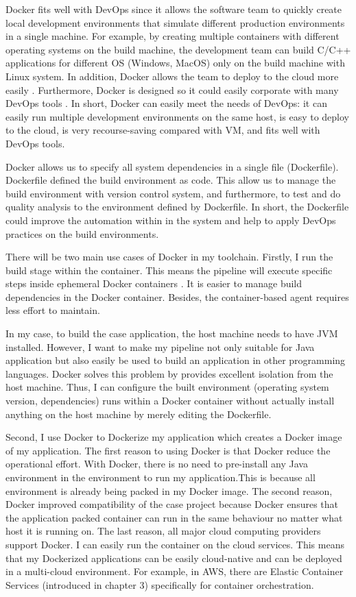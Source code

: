 Docker fits well with DevOps since it allows the software team to quickly create local development environments that simulate different production environments in a single machine. For example, by creating multiple containers with different operating systems on the build machine, the development team can build C/C++ applications for different OS (Windows, MacOS) only on the build machine with Linux system.
In addition, Docker allows the team to deploy to the cloud more easily \cite{vaughan2014docker}. Furthermore, Docker is designed so it could easily corporate with many DevOps tools \cite{Whosusin96:online}. In short, Docker can easily meet the needs of DevOps: it can easily run multiple development environments on the same host, is easy to deploy to the cloud, is very recourse-saving compared with VM, and fits well with DevOps tools.
\par
Docker allows us to specify all system dependencies in a single file (Dockerfile). Dockerfile defined the build environment as code. This allow us to manage the build environment with version control system, and furthermore, to test and do quality analysis to the environment defined by Dockerfile. In short, the Dockerfile could improve the automation within in the system and help to apply DevOps practices on the build environments.
\par
\label{docker}
There will be two main use cases of Docker in my toolchain. Firstly, I run the build stage within the container.
This means the pipeline will execute specific steps inside ephemeral Docker containers \cite{Overview44:online}. It is easier to manage build dependencies in the Docker container. Besides, the container-based agent requires less effort to maintain.
\par
In my case, to build the case application, the host machine needs to have JVM installed. However, I want to make my pipeline not only suitable for Java application but also easily be used to build an application in other programming languages. Docker solves this problem by provides excellent isolation from the host machine. Thus, I can configure the built environment (operating system version, dependencies) runs within a Docker container without actually install anything on the host machine by merely editing the Dockerfile.
\par
Second, I use Docker to Dockerize my application which creates a Docker image of my application. The first reason to using Docker is that Docker reduce the operational effort.
With Docker, there is no need to pre-install any Java environment in the environment to run my application.This is because all environment is already being packed in my Docker image. 
The second reason, Docker improved compatibility of the case project because Docker ensures that the application packed container can run in the same behaviour no matter what host it is running on.
The last reason, all major cloud computing providers support Docker. 
I can easily run the container on the cloud services. This means that my Dockerized applications can be easily cloud-native and can be deployed in a multi-cloud environment. For example, in AWS, there are Elastic Container Services (introduced in chapter 3) specifically for container orchestration.
